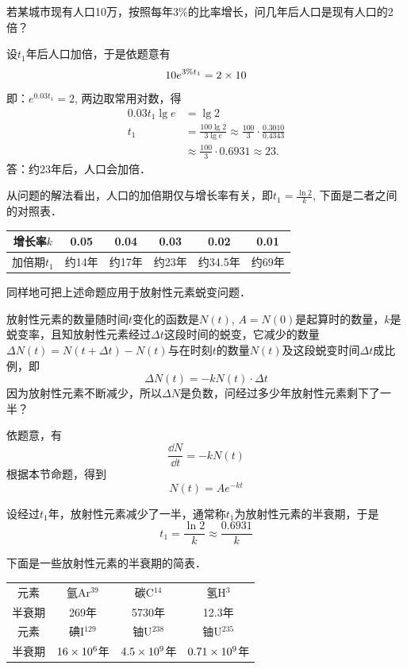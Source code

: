 \begin{example}
    若某城市现有人口10万，按照每年3\%的比率增长，问几年后人口是现有人口的2倍？
\end{example}

\begin{solution}
    设$t_1$年后人口加倍，于是依题意有
\[10e^{3\%t_1}=2\times10\]
即：$e^{0.03t_1}=2$, 两边取常用对数，得
\[\begin{split}
    0.03t_1\lg e&=\lg2\\
t_1&= \frac{100\lg2}{3\lg e}\approx \frac{100}{3}\cdot\frac{0.3010}{0. 4343}\\
&\approx \frac{100}{3}\cdot 0.6931\approx 23.
\end{split} \]
答：约23年后，人口会加倍．
\end{solution}

从问题的解法看出，人口的加倍期仅与增长率有关，即$t_1=\frac{\ln2}{k}$, 下面是二者之间的对照表．

\begin{center}
\begin{tabular}{c|ccccc}
\hline
    增长率$k$ & 0.05&0.04&0.03&0.02&0.01\\
\hline
加倍期$t_1$ & 约14年& 约17年& 约23年& 约34.5年& 约69年\\
\hline
        \end{tabular}
\end{center}

同样地可把上述命题应用于放射性元素蜕变问题．

\begin{example}
    放射性元素的数量随时间$t$变化的函数是$N(t)$, $A=N(0)$是起算时的数量，$k$是蜕变率，且知放射性元素经过$\Delta t$这段时间的蜕变，它减少的数量$\Delta N(t)=N(t+\Delta t)-N(t)$与在时刻$t$的数量$N(t)$及这段蜕变时间$\Delta t$成比
例，即
\[\Delta N (t) =-kN (t) \cdot \Delta t\]
因为放射性元素不断减少，所以$\Delta N$是负数，问经过多少年放射性元素剩下了一半？
\end{example}

\begin{solution}
    依题意，有
\[\frac{\dd N}{\dd t}=-kN (t) \]
根据本节命题，得到
\[N (t) =Ae^{-kt}\]

设经过$t_1$年，放射性元素减少了一半，通常称$t_1$为放射性元素的半衰期，于是
\[t_1=\frac{\ln 2}{k}\approx \frac{0. 6931}{k}\]
\end{solution}

下面是一些放射性元素的半衰期的简表．

\begin{center}
    \begin{tabular}{c|ccc}
    \hline
        元素 & 氩Ar$^{39}$ &碳C$^{14}$&氢H$^3$  \\
    半衰期 & 269年& 5730年& 12.3年 \\
    \hline
    元素 & 碘I$^{129}$ &铀U$^{238}$& 铀U$^{235}$ \\
    半衰期 &  $16\times10^6$年& $4.5\times 10^9$年& $0.71\times 10^9$年\\
    \hline
            \end{tabular}
    \end{center}

